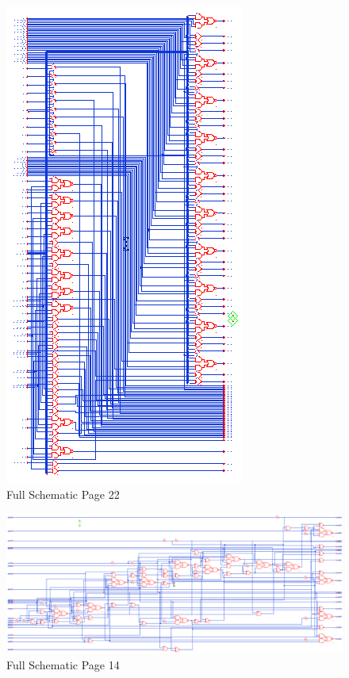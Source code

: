 \documentclass[11pt]{article}
\begin{document}
	
	\begin{figure}[H] 
		\centering 
		\includegraphics[width=0.7\linewidth]{"Pictures/Full Schematic Page 22"}
		\caption{Full Schematic Page 22} 
		\label{fig:Full-Schematic-Page-22} 
	\end{figure}
	
	
	\begin{figure}[H] 
		\centering 
		\includegraphics[width=0.7\linewidth]{"Pictures/Full Schematic Page 14"}
		\caption{Full Schematic Page 14} 
		\label{fig:Full-Schematic-Page-14} 
	\end{figure}
	
\end{document}

